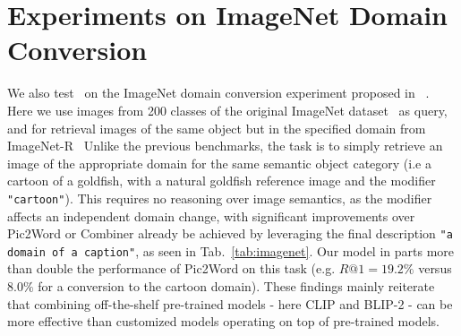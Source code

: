 \documentclass{article} \usepackage{iclr2024_conference,times}
\begin{document}
\section{Experiments on ImageNet Domain Conversion}
\begin{table}[t]
\centering
\caption{\textbf{Evaluation on ImageNet Domain Conversion experiment proposed in \cite{pic2word}.} The goal is to retrieve an appropriate domain of the object specified in the query image.} 
\vspace{-6pt}
\label{tab:imagenet}
\vspace{-8pt}
\end{table}
 We also test \methodNameNS\ on the ImageNet domain conversion experiment proposed in ~\citep{pic2word}. Here we use images from 200 classes of the original ImageNet dataset~\citep{imagenet} as query, and for retrieval images of the same object but in the specified domain from ImageNet-R~\citep{imagenetr}
Unlike the previous benchmarks, the task is to simply retrieve an image of the appropriate domain for the same semantic object category (i.e a cartoon of a goldfish, with a natural goldfish reference image and the modifier \texttt{"cartoon"}).  
This requires no reasoning over image semantics, as the modifier affects an independent domain change, with significant improvements over Pic2Word or Combiner already be achieved by leveraging the final description \texttt{"a {domain} of a {caption}"}, as seen in Tab.~\ref{tab:imagenet}. Our model in parts more than double the performance of Pic2Word on this task (e.g. $R@1=19.2\%$ versus $8.0\%$ for a conversion to the cartoon domain). 
These findings mainly reiterate that combining off-the-shelf pre-trained models - here CLIP and BLIP-2 - can be more effective than customized models operating on top of pre-trained models.
\end{document}
